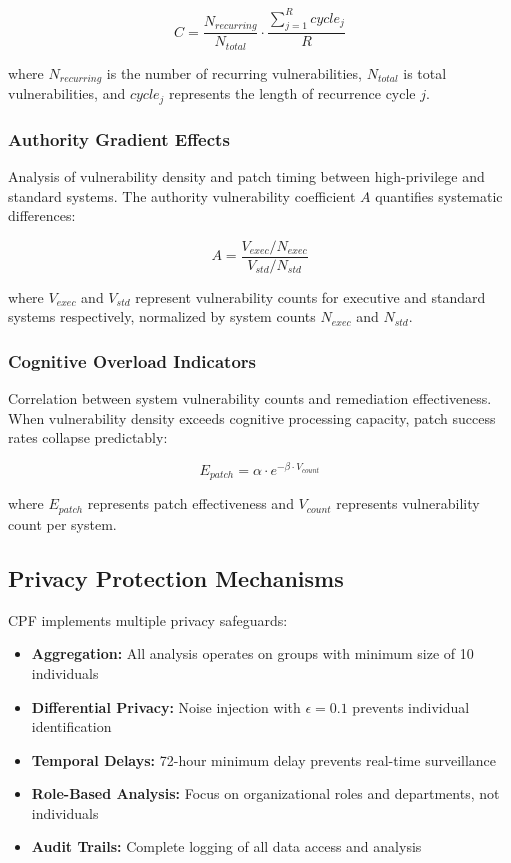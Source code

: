 \documentclass[10pt, twocolumn]{article}
\begin{document}
$$C = \frac{N_{recurring}}{N_{total}} \cdot \frac{\sum_{j=1}^{R} cycle_j}{R}$$

where $N_{recurring}$ is the number of recurring vulnerabilities, $N_{total}$ is total vulnerabilities, and $cycle_j$ represents the length of recurrence cycle $j$.

\subsubsection{Authority Gradient Effects}
Analysis of vulnerability density and patch timing between high-privilege and standard systems. The authority vulnerability coefficient $A$ quantifies systematic differences:

$$A = \frac{V_{exec} / N_{exec}}{V_{std} / N_{std}}$$

where $V_{exec}$ and $V_{std}$ represent vulnerability counts for executive and standard systems respectively, normalized by system counts $N_{exec}$ and $N_{std}$.

\subsubsection{Cognitive Overload Indicators}
Correlation between system vulnerability counts and remediation effectiveness. When vulnerability density exceeds cognitive processing capacity, patch success rates collapse predictably:

$$E_{patch} = \alpha \cdot e^{-\beta \cdot V_{count}}$$

where $E_{patch}$ represents patch effectiveness and $V_{count}$ represents vulnerability count per system.

\subsection{Privacy Protection Mechanisms}

CPF implements multiple privacy safeguards:

\begin{itemize}
\item \textbf{Aggregation:} All analysis operates on groups with minimum size of 10 individuals
\item \textbf{Differential Privacy:} Noise injection with $\epsilon = 0.1$ prevents individual identification
\item \textbf{Temporal Delays:} 72-hour minimum delay prevents real-time surveillance
\item \textbf{Role-Based Analysis:} Focus on organizational roles and departments, not individuals
\item \textbf{Audit Trails:} Complete logging of all data access and analysis
\end{itemize}
\end{document}
